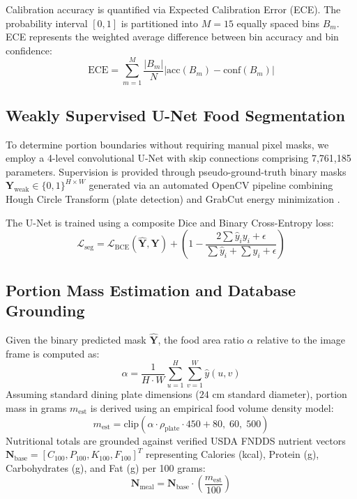 \documentclass[conference]{IEEEtran}
\begin{document}
Calibration accuracy is quantified via Expected Calibration Error (ECE). The probability interval $[0, 1]$ is partitioned into $M = 15$ equally spaced bins $B_m$. ECE represents the weighted average difference between bin accuracy and bin confidence:
\begin{equation}
\text{ECE} = \sum_{m=1}^{M} \frac{|B_m|}{N} \left| \text{acc}(B_m) - \text{conf}(B_m) \right|
\end{equation}

\subsection{Weakly Supervised U-Net Food Segmentation}
To determine portion boundaries without requiring manual pixel masks, we employ a 4-level convolutional U-Net with skip connections comprising 7,761,185 parameters. Supervision is provided through pseudo-ground-truth binary masks $\mathbf{Y}_{\text{weak}} \in \{0, 1\}^{H \times W}$ generated via an automated OpenCV pipeline combining Hough Circle Transform (plate detection) and GrabCut energy minimization \cite{rother2004}.

The U-Net is trained using a composite Dice and Binary Cross-Entropy loss:
\begin{equation}
\mathcal{L}_{\text{seg}} = \mathcal{L}_{\text{BCE}}(\hat{\mathbf{Y}}, \mathbf{Y}) + \left( 1 - \frac{2 \sum \hat{y}_i y_i + \epsilon}{\sum \hat{y}_i + \sum y_i + \epsilon} \right)
\end{equation}

\subsection{Portion Mass Estimation and Database Grounding}
Given the binary predicted mask $\hat{\mathbf{Y}}$, the food area ratio $\alpha$ relative to the image frame is computed as:
\begin{equation}
\alpha = \frac{1}{H \cdot W} \sum_{u=1}^{H} \sum_{v=1}^{W} \hat{y}(u, v)
\end{equation}
Assuming standard dining plate dimensions ($24\text{ cm}$ standard diameter), portion mass in grams $m_{\text{est}}$ is derived using an empirical food volume density model:
\begin{equation}
m_{\text{est}} = \text{clip}\left( \alpha \cdot \rho_{\text{plate}} \cdot 450 + 80, \; 60, \; 500 \right)
\end{equation}
Nutritional totals are grounded against verified USDA FNDDS nutrient vectors $\mathbf{N}_{\text{base}} = [C_{\text{100}}, P_{\text{100}}, K_{\text{100}}, F_{\text{100}}]^T$ representing Calories (kcal), Protein (g), Carbohydrates (g), and Fat (g) per 100 grams:
\begin{equation}
\mathbf{N}_{\text{meal}} = \mathbf{N}_{\text{base}} \cdot \left(\frac{m_{\text{est}}}{100}\right)
\end{equation}
\end{document}

